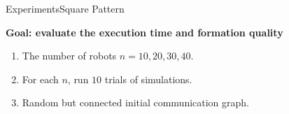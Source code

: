 \begin{frame}{Experiments}{Square Pattern}
  \small{
    \textbf{Goal: evaluate the execution time and formation quality}
    \begin{enumerate}
    \item The number of robots $n=10,20,30,40$.
    \item For each $n$, run $10$ trials of simulations.
    \item Random but connected initial communication graph.
    \end{enumerate}
  }
\end{frame}